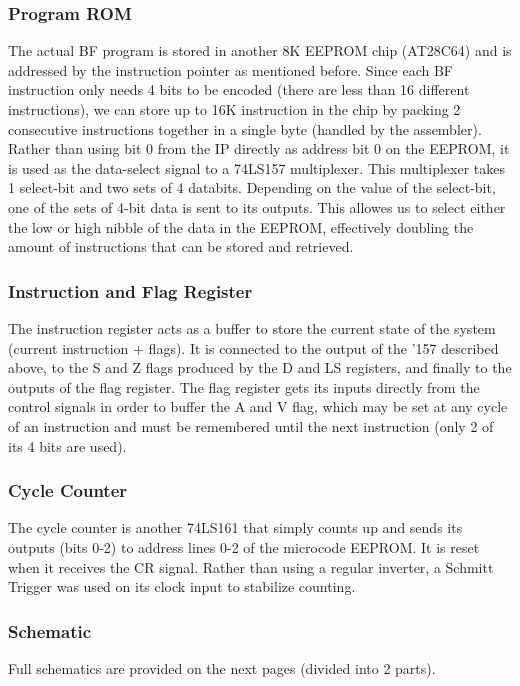 \subsubsection{Program ROM}
The actual BF program is stored in another 8K EEPROM chip (AT28C64) and is addressed by the instruction pointer as mentioned before. Since each BF instruction only needs 4 bits to be encoded (there are less than 16 different instructions), we can store up to 16K instruction in the chip by packing 2 consecutive instructions together in a single byte (handled by the assembler). Rather than using bit 0 from the IP directly as address bit 0 on the EEPROM, it is used as the data-select signal to a 74LS157 multiplexer. This multiplexer takes 1 select-bit and two sets of 4 databits. Depending on the value of the select-bit, one of the sets of 4-bit data is sent to its outputs. This allowes us to select either the low or high nibble of the data in the EEPROM, effectively doubling the amount of instructions that can be stored and retrieved.

\subsubsection{Instruction and Flag Register}
The instruction register acts as a buffer to store the current state of the system (current instruction + flags). It is connected to the output of the '157 described above, to the S and Z flags produced by the D and LS registers, and finally to the outputs of the flag register. The flag register gets its inputs directly from the control signals in order to buffer the A and V flag, which may be set at any cycle of an instruction and must be remembered until the next instruction (only 2 of its 4 bits are used).

\subsubsection{Cycle Counter}
The cycle counter is another 74LS161 that simply counts up and sends its outputs (bits 0-2) to address lines 0-2 of the microcode EEPROM. It is reset when it receives the CR signal. Rather than using a regular inverter, a Schmitt Trigger was used on its clock input to stabilize counting.


\subsubsection{Schematic}
Full schematics are provided on the next pages (divided into 2 parts).


